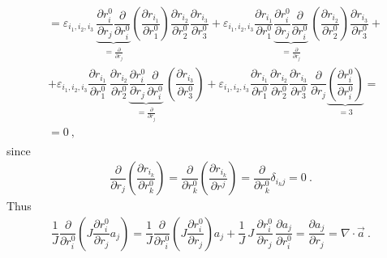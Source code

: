 \documentclass[letterpaper,10pt,english]{jupyterBook}
\begin{document}
\begin{equation*}
\begin{split}
\begin{aligned}
 & = \varepsilon_{i_1, i_2, i_3}  \, \underbrace{\dfrac{\partial r^0_i}{\partial r_j}\dfrac{\partial }{\partial r_i^0}}_{= \frac{\partial }{\partial r_j}} \left(\dfrac{\partial r_{i_1}}{\partial r^0_1} \right)\dfrac{\partial r_{i_2}}{\partial r^0_2} \dfrac{\partial r_{i_3}}{\partial r^0_3} 
   + \varepsilon_{i_1, i_2, i_3}  \dfrac{\partial r_{i_1}}{\partial r^0_1} \underbrace{ \dfrac{\partial r^0_i}{\partial r_j} \dfrac{\partial }{\partial r_i^0}}_{= \frac{\partial }{\partial r_j}} \, \left(\dfrac{\partial r_{i_2}}{\partial r^0_2} \right) \dfrac{\partial r_{i_3}}{\partial r^0_3} + \\
 & + \varepsilon_{i_1, i_2, i_3} \dfrac{\partial r_{i_1}}{\partial r^0_1} \, \dfrac{\partial r_{i_2}}{\partial r^0_2} \underbrace{\dfrac{\partial r^0_i}{\partial r_j}\dfrac{\partial }{\partial r_i^0}}_{=\frac{\partial}{\partial r_j}} \, \left(\dfrac{\partial r_{i_3}}{\partial r^0_3}\right)  
   + \varepsilon_{i_1, i_2, i_3}\dfrac{\partial r_{i_1}}{\partial r^0_1} \dfrac{\partial r_{i_2}}{\partial r^0_2} \dfrac{\partial r_{i_3}}{\partial r^0_3} \, \dfrac{\partial }{\partial r_j} \underbrace{\left(  \dfrac{\partial r^0_i}{\partial r^0_i} \right)}_{=3} = \\
   & = 0 \ ,
\end{aligned}\end{split}
\end{equation*}
\sphinxAtStartPar
since
\begin{equation*}
\begin{split}\dfrac{\partial }{\partial r_j} \left( \dfrac{\partial r_{i_k}}{\partial r^0_k} \right) = \dfrac{\partial }{\partial r^0_k} \left( \dfrac{\partial r_{i_k}}{\partial r^j} \right) = \dfrac{\partial}{\partial r^0_k} \delta_{i_k j} = 0 \ .\end{split}
\end{equation*}
\sphinxAtStartPar
Thus
\begin{equation*}
\begin{split}\dfrac{1}{J}\dfrac{\partial}{\partial r^0_i} \left( J \dfrac{\partial r^0_i}{\partial r_j} a_j \right) = 
\dfrac{1}{J}\dfrac{\partial}{\partial r^0_i} \left( J \dfrac{\partial r^0_i}{\partial r_j} \right) a_j + \dfrac{1}{J} \, J \, \dfrac{\partial r^0_i}{\partial r_j} \, \dfrac{\partial a_j}{\partial r^0_i} = \dfrac{\partial a_j}{\partial r_j} = \nabla \cdot \vec{a} \ . \end{split}
\end{equation*}
\end{document}
